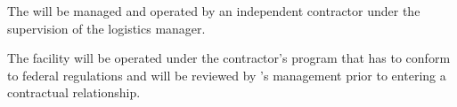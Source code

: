 The  will be managed and operated by an independent contractor under the supervision of the %
 logistics manager. 

The facility will be operated under the contractor's  program that has to conform to federal regulations and will be reviewed by 's  management prior to entering a contractual relationship.

